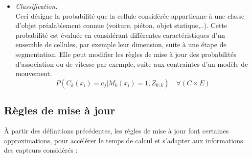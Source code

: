\begin{itemize}
	\item{\emph{Classification:\\}}
	Ceci désigne la probabilité que la cellule considérée appartienne à une classe d'objet préalablement connue (voiture, piéton, objet statique,..). Cette probabilité est évaluée en considérant différentes caractéristiques d'un ensemble de cellules, par exemple leur dimension, suite à une étape de segmentation. Elle peut modifier les règles de mise à jour des probabilités d'association ou de vitesse par exemple, suite aux contraintes d'un modèle de mouvement.
	\begin{equation}
		P(C_k(x_i) = c_j | M_k(x_i) = 1, Z_{0:k}) \quad \forall { (C \times E) }
	\end{equation}
\end{itemize}

\subsection{Règles de mise à jour}
À partir des définitions précédentes, les règles de mise à jour font certaines approximations, pour accélérer le temps de calcul et s'adapter aux informations des capteurs considérés : \\

